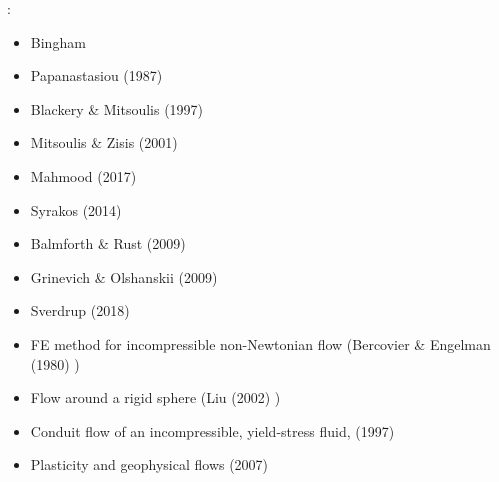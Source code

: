 \Literature: 
\begin{itemize}
\item Bingham \cite{bingham}
\item Papanastasiou (1987) \cite{papa87}
\item Blackery \& Mitsoulis (1997) \cite{blmi97}
\item Mitsoulis \& Zisis (2001) \cite{mizi01}
\item Mahmood \etal (2017) \cite{maky17}
\item Syrakos \etal (2014) \cite{syga14}
\item Balmforth \& Rust (2009) \cite{baru09}
\item Grinevich \& Olshanskii (2009) \cite{grol09}
\item Sverdrup \etal (2018) \cite{svna18}
\item FE method for incompressible non-Newtonian flow (Bercovier \& Engelman (1980) \cite{been80})
\item Flow around a rigid sphere (Liu \etal (2002) \cite{limd02})
\item Conduit flow of an incompressible, yield-stress fluid, \textcite{tawi97} (1997)
\item Plasticity and geophysical flows \cite{ance07} (2007)
\end{itemize}

